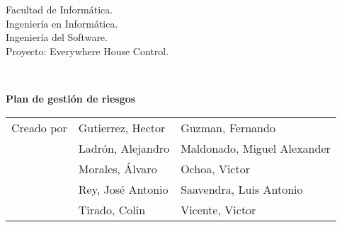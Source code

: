 \begin{titlepage}
    \begin{scriptsize}\noindent Facultad de Informática.\\
        Ingeniería en Informática.\\
        Ingeniería del Software.\\
        Proyecto: Everywhere House Control.
    \end{scriptsize}\\
    \vfill
    \begin{center}
        \begin{Large}
            \textbf{Plan de gestión de riesgos}
        \end{Large}
    \end{center}
    \vfill
    \begin{flushright}
        \begin{scriptsize}
            \begin{tabular}{lll}
                Creado por & Gutierrez, Hector & Guzman, Fernando  \\
                & Ladrón, Alejandro & Maldonado, Miguel Alexander \\
                & Morales, Álvaro & Ochoa, Victor \\
                & Rey, José Antonio & Saavendra, Luis Antonio  \\
                & Tirado, Colin & Vicente, Victor \\
            \end{tabular}
        \end{scriptsize}
    \end{flushright}
\end{titlepage}
\thispagestyle{empty}
\cleardoublepage
\newpage

\tableofcontents
\newpage
\thispagestyle{empty}
\cleardoublepage
\newpage
{}
\raggedbottom
{}








